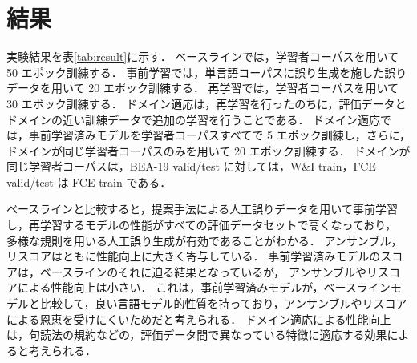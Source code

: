 \documentclass[
  platex, dvipdfmx %
]{nlp2021}
\begin{document}
\section{結果}

実験結果を表\ref{tab:result}に示す．
ベースラインでは，学習者コーパスを用いて 50 エポック訓練する．
事前学習では，単言語コーパスに誤り生成を施した誤りデータを用いて 20 エポック訓練する．
再学習では，学習者コーパスを用いて 30 エポック訓練する．
ドメイン適応は，再学習を行ったのちに，評価データとドメインの近い訓練データで追加の学習を行うことである．
ドメイン適応では，事前学習済みモデルを学習者コーパスすべてで 5 エポック訓練し，さらに，ドメインが同じ学習者コーパスのみを用いて 20 エポック訓練する．
ドメインが同じ学習者コーパスは，BEA-19 valid/test に対しては，W\&I train，FCE valid/test は FCE train である．

ベースラインと比較すると，提案手法による人工誤りデータを用いて事前学習し，再学習するモデルの性能がすべての評価データセットで高くなっており，
多様な規則を用いる人工誤り生成が有効であることがわかる．
アンサンブル，リスコアはともに性能向上に大きく寄与している．
事前学習済みモデルのスコアは，ベースラインのそれに迫る結果となっているが，
アンサンブルやリスコアによる性能向上は小さい．
これは，事前学習済みモデルが，ベースラインモデルと比較して，良い言語モデル的性質を持っており，アンサンブルやリスコアによる恩恵を受けにくいためだと考えられる．
ドメイン適応による性能向上は，句読法の規約などの，評価データ間で異なっている特徴に適応する効果によると考えられる．
\end{document}
